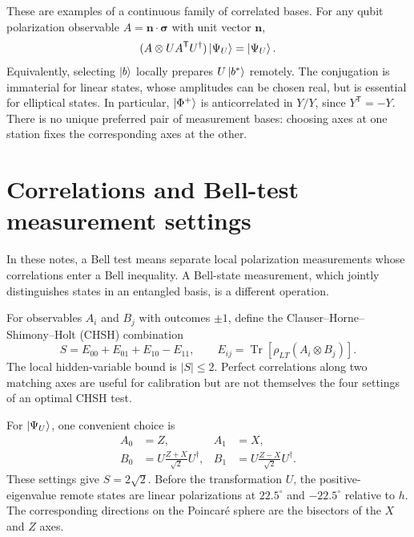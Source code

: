 \documentclass[a4paper,10pt]{article}
\newcommand{\Tr}{\operatorname{Tr}}
\begin{document}
These are examples of a continuous family of correlated bases. For any
qubit polarization observable $A=\boldsymbol{n}\cdot\boldsymbol{\sigma}$
with unit vector $\boldsymbol n$,
\begin{equation}
    (A\otimes UA^{\mathsf T}U^\dagger)\ket{\Psi_U}
    =\ket{\Psi_U}.
    \label{eq:general-matched-observable}
\end{equation}
Equivalently, selecting $\ket b$ locally prepares $U\ket{b^*}$ remotely.
The conjugation is immaterial for linear states, whose amplitudes can be
chosen real, but is essential for elliptical states. In particular,
$\ket{\Phi^+}$ is anticorrelated in $Y/Y$, since $Y^{\mathsf T}=-Y$.
There is no unique preferred pair of measurement bases: choosing axes at
one station fixes the corresponding axes at the other.

\section{Correlations and Bell-test measurement settings}

In these notes, a Bell test means separate local polarization measurements
whose correlations enter a Bell inequality. A Bell-state measurement,
which jointly distinguishes states in an entangled basis, is a different
operation.

For observables $A_i$ and $B_j$ with outcomes $\pm1$, define the
Clauser--Horne--Shimony--Holt (CHSH) combination
\begin{equation}
    S=E_{00}+E_{01}+E_{10}-E_{11},
    \qquad E_{ij}=\Tr\!\left[\rho_{LT}(A_i\otimes B_j)\right].
    \label{eq:chsh}
\end{equation}
The local hidden-variable bound is $|S|\leq2$. Perfect correlations along
two matching axes are useful for calibration but are not themselves the
four settings of an optimal CHSH test.

For $\ket{\Psi_U}$, one convenient choice is
\begin{equation}
    \begin{aligned}
        A_0&=Z,& A_1&=X,\\
        B_0&=U\frac{Z+X}{\sqrt{2}}U^\dagger,
        &B_1&=U\frac{Z-X}{\sqrt{2}}U^\dagger.
    \end{aligned}
    \label{eq:ideal-chsh-settings}
\end{equation}
These settings give $S=2\sqrt{2}$. Before the transformation $U$, the
positive-eigenvalue remote states are linear polarizations at $22.5^\circ$
and $-22.5^\circ$ relative to $h$. The corresponding directions on the
Poincar\'e sphere are the bisectors of the $X$ and $Z$ axes.
\end{document}
